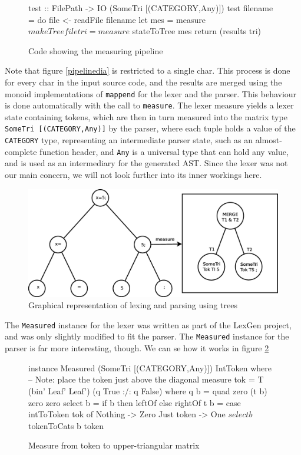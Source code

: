 \documentclass[a4paper,12pt,twosided]{report}
\begin{document}
\begin{figure}[H]
\begin{code}
test :: FilePath -> IO (SomeTri [(CATEGORY,Any)])
test filename = do
    file <- readFile filename
    let mes = measure $ makeTree file
        tri = measure $ stateToTree mes
    return (results tri)
\end{code} 
\caption{Code showing the measuring pipeline}
\end{figure}

Note that figure \ref{pipelinedia} is restricted to a single char. This process
is done for every char in the input source code, and the results are merged
using the monoid implementations of \texttt{mappend} for the lexer and the
parser. This behaviour is done automatically with the call to \texttt{measure}.
The lexer measure yields a lexer state containing tokens, which are then
in turn measured into the matrix type \texttt{SomeTri [(CATEGORY,Any)]} by the
parser, where each tuple holds a value of the \texttt{CATEGORY} type,
representing an intermediate parser state, such as an almost-complete function
header, and \texttt{Any} is a universal type that can hold any value, and is
used as an intermediary for the generated AST. Since the lexer was not our main
concern, we will not look further into its inner workings here.

\begin{figure}[H]
\includegraphics[width=\textwidth]{tree.eps}
\caption{\label{treemeasure}Graphical representation of lexing and parsing using
trees}
\end{figure}

The \texttt{Measured} instance for the lexer was written as part of the LexGen
project, and was only slightly modified to fit the parser. The \texttt{Measured}
instance for the parser is far more interesting, though. We can se how it works
in figure \ref{parsemeasure}

\begin{figure}[H]
\begin{code}
instance Measured (SomeTri [(CATEGORY,Any)]) IntToken where
    -- Note: place the token just above the diagonal
    measure tok = T (bin' Leaf' Leaf') (q True :/: q False)
      where q b = quad zero (t b) zero zero
            select b = if b then leftOf else rightOf
            t b = case intToToken tok of
                Nothing    -> Zero
                Just token -> One $ select b $ tokenToCats b token

\end{code}
\caption{\label{parsemeasure} Measure from token to upper-triangular matrix}
\end{figure}
\end{document}
